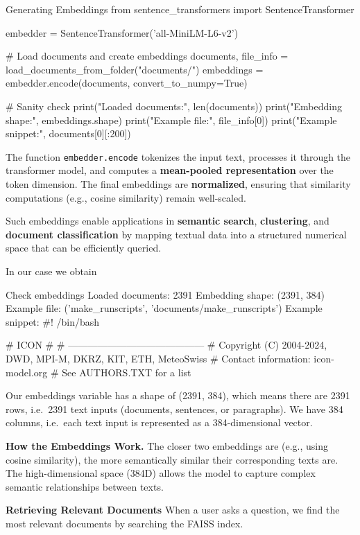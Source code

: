 \begin{codeonly}{Generating Embeddings}
from sentence_transformers import SentenceTransformer

embedder = SentenceTransformer('all-MiniLM-L6-v2')

# Load documents and create embeddings
documents, file_info = load_documents_from_folder("documents/")
embeddings = embedder.encode(documents, convert_to_numpy=True)

# Sanity check
print("Loaded documents:", len(documents))
print("Embedding shape:", embeddings.shape)
print("Example file:", file_info[0])
print("Example snippet:\n", documents[0][:200])
\end{codeonly}

The function \texttt{embedder.encode} tokenizes the input text, processes it through the transformer model, and computes a \textbf{mean-pooled representation} over the token dimension. The final embeddings are \textbf{normalized}, ensuring that similarity computations (e.g., cosine similarity) remain well-scaled.

Such embeddings enable applications in \textbf{semantic search}, \textbf{clustering}, and \textbf{document classification} by mapping textual data into a structured numerical space that can be efficiently queried.

In our case we obtain
\begin{codeonly}{Check embeddings}
Loaded documents: 2391
Embedding shape: (2391, 384)
Example file: ('make_runscripts', 'documents/make_runscripts')
Example snippet:
 #! /bin/bash

# ICON
#
# ------------------------------------------
# Copyright (C) 2004-2024, DWD, MPI-M, DKRZ, KIT, ETH, MeteoSwiss
# Contact information: icon-model.org
# See AUTHORS.TXT for a list
\end{codeonly}

Our embeddings variable has a shape of (2391, 384), which means there are 
2391 rows, i.e.\ 2391 text inputs (documents, sentences, or paragraphs). We have
384 columns, i.e.\ each text input is represented as a 384-dimensional vector.

{\bf How the Embeddings Work.}
The closer two embeddings are (e.g., using cosine similarity), the more semantically similar their corresponding texts are.
The high-dimensional space (384D) allows the model to capture complex semantic relationships between texts.

\bigskip
{\bf Retrieving Relevant Documents}
When a user asks a question, we find the most relevant documents by searching the FAISS index.

